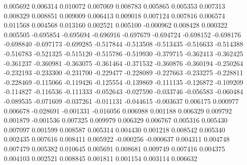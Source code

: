 0.005692
0.006314
0.010072
0.007069
0.008783
0.005865
0.005353
0.007313
0.008329
0.008851
0.009009
0.006413
0.009018
0.007124
0.007816
0.006574
0.011568
0.004568
0.013160
0.002521
0.005100
-0.000962
0.008428
0.000322
0.005505
-0.695854
-0.695694
-0.696916
-0.697679
-0.694724
-0.698152
-0.698176
-0.698840
-0.697173
-0.699285
-0.517844
-0.513508
-0.513435
-0.516633
-0.514388
-0.516783
-0.521325
-0.515120
-0.515786
-0.519930
-0.379715
-0.362413
-0.362425
-0.361237
-0.360981
-0.363075
-0.361464
-0.371532
-0.360876
-0.360194
-0.250264
-0.232193
-0.233300
-0.231700
-0.229477
-0.228089
-0.227663
-0.233275
-0.228811
-0.228469
-0.115066
-0.119426
-0.125554
-0.139869
-0.111135
-0.126872
-0.109209
-0.114827
-0.116536
-0.111333
-0.052643
-0.027590
-0.033746
-0.056583
-0.060484
-0.089535
-0.071609
-0.037261
-0.011131
-0.044615
-0.003637
0.006175
0.000977
0.006678
-0.028691
-0.001331
-0.016056
0.006988
0.001188
0.006329
0.009792
0.001879
-0.001536
0.007325
0.009979
0.006329
0.006767
0.005316
0.005430
0.007097
0.001599
0.008587
0.005314
0.004430
0.001218
0.008542
0.005340
0.002435
0.007616
0.008411
0.005922
-0.000256
-0.000637
0.004311
0.004748
0.007479
0.005382
0.010645
0.005691
0.008681
0.009749
0.007416
0.004375
0.004103
0.002521
0.008845
0.001811
0.001154
0.003114
0.006632
